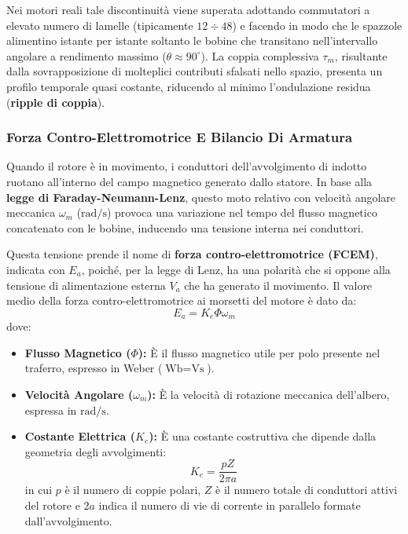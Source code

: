 ﻿\documentclass[11pt, a4paper]{article}
\begin{document}
Nei motori reali tale discontinuità viene superata adottando commutatori a elevato numero di lamelle (tipicamente $12 \div 48$) e facendo in modo che le spazzole alimentino istante per istante soltanto le bobine che transitano nell'intervallo angolare a rendimento massimo ($\theta \approx 90^\circ$). La coppia complessiva $\tau_m$, risultante dalla sovrapposizione di molteplici contributi sfalsati nello spazio, presenta un profilo temporale quasi costante, riducendo al minimo l'ondulazione residua (\textbf{ripple di coppia}).

\subsubsection{Forza Contro-Elettromotrice E Bilancio Di Armatura}
Quando il rotore è in movimento, i conduttori dell'avvolgimento di indotto ruotano all'interno del campo magnetico generato dallo statore. In base alla \textbf{legge di Faraday-Neumann-Lenz}, questo moto relativo con velocità angolare meccanica $\omega_m$ ($\si{\radian\per\second}$) provoca una variazione nel tempo del flusso magnetico concatenato con le bobine, inducendo una tensione interna nei conduttori.

Questa tensione prende il nome di \textbf{forza contro-elettromotrice (FCEM)}, indicata con $E_a$, poiché, per la legge di Lenz, ha una polarità che si oppone alla tensione di alimentazione esterna $V_a$ che ha generato il movimento. Il valore medio della forza contro-elettromotrice ai morsetti del motore è dato da:
\[
    E_a = K_e \Phi \omega_m
\]
dove:
\begin{itemize}
    \item \textbf{Flusso Magnetico ($\Phi$):} È il flusso magnetico utile per polo presente nel traferro, espresso in Weber ($\si{\weber} = \si{\volt\second}$).
    \item \textbf{Velocità Angolare ($\omega_m$):} È la velocità di rotazione meccanica dell'albero, espressa in $\si{\radian\per\second}$.
    \item \textbf{Costante Elettrica ($K_e$):} È una costante costruttiva che dipende dalla geometria degli avvolgimenti:
    \[
        K_e = \frac{p Z}{2\pi a}
    \]
    in cui $p$ è il numero di coppie polari, $Z$ è il numero totale di conduttori attivi del rotore e $2a$ indica il numero di vie di corrente in parallelo formate dall'avvolgimento.
\end{itemize}
\end{document}
